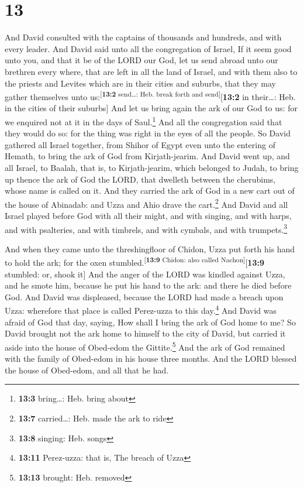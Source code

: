 \hypertarget{section-12}{%
\section{13}\label{section-12}}

 And David consulted with the captains of thousands and
hundreds, and with every leader.  And David said unto all
the congregation of Israel, If it seem good unto you, and that it be of
the LORD our God, let us send abroad unto our brethren every where, that
are left in all the land of Israel, and with them also to the priests
and Levites which are in their cities and suburbs, that they may gather
themselves unto us:\textsuperscript{{[}\textbf{13:2} send\ldots: Heb.
break forth and send{]}}{[}\textbf{13:2} in their\ldots: Heb. in the
cities of their suburbs{]}  And let us bring again the ark
of our God to us: for we enquired not at it in the days of
Saul.\footnote{\textbf{13:3} bring\ldots: Heb. bring about}
 And all the congregation said that they would do so: for
the thing was right in the eyes of all the people.  So
David gathered all Israel together, from Shihor of Egypt even unto the
entering of Hemath, to bring the ark of God from Kirjath-jearim.
 And David went up, and all Israel, to Baalah, that is, to
Kirjath-jearim, which belonged to Judah, to bring up thence the ark of
God the LORD, that dwelleth between the cherubims, whose name is called
on it.  And they carried the ark of God in a new cart out
of the house of Abinadab: and Uzza and Ahio drave the cart.\footnote{\textbf{13:7}
  carried\ldots: Heb. made the ark to ride}  And David and
all Israel played before God with all their might, and with singing, and
with harps, and with psalteries, and with timbrels, and with cymbals,
and with trumpets.\footnote{\textbf{13:8} singing: Heb. songs}

 And when they came unto the threshingfloor of Chidon,
Uzza put forth his hand to hold the ark; for the oxen
stumbled.\textsuperscript{{[}\textbf{13:9} Chidon: also called
Nachon{]}}{[}\textbf{13:9} stumbled: or, shook it{]}  And
the anger of the LORD was kindled against Uzza, and he smote him,
because he put his hand to the ark: and there he died before God.
 And David was displeased, because the LORD had made a
breach upon Uzza: wherefore that place is called Perez-uzza to this
day.\footnote{\textbf{13:11} Perez-uzza: that is, The breach of Uzza}
 And David was afraid of God that day, saying, How shall
I bring the ark of God home to me?  So David brought not
the ark home to himself to the city of David, but carried it aside into
the house of Obed-edom the Gittite.\footnote{\textbf{13:13} brought:
  Heb. removed}  And the ark of God remained with the
family of Obed-edom in his house three months. And the LORD blessed the
house of Obed-edom, and all that he had.

